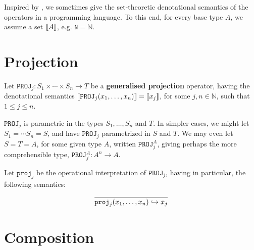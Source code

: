 Inspired by \cite{hofmann-2003}, we sometimes give the set-theoretic
denotational semantics of the operators in a programming language. To this end,
for every base type $A$, we assume a set ${\mathopen{}\left\llbracket{A}\right\rrbracket\mathclose{}}$, e.g. $\mathtt{N} =
\mathbb{N}$.

\section{Projection}

\label{sec:generalised-projection}

\begin{definition} Let $\mathtt{PROJ}_j : S_1 \times \cdots \times S_n
\rightarrow T$ be a \textbf{generalised projection} operator, having the
denotational semantics ${\mathopen{}\left\llbracket{\mathtt{PROJ}_j{\ensuremath{\mathopen{}\left({x_1,\ldots,x_n}\right)\mathclose{}}}}\right\rrbracket\mathclose{}} = {\mathopen{}\left\llbracket{x_j}\right\rrbracket\mathclose{}}$,
for some $j,n \in \mathbb{N}$, such that $1 \leq j \leq n$.  \end{definition}

\begin{remark} $\mathtt{PROJ}_j$ is parametric in the types $S_1,\ldots,S_n$
and $T$. In simpler cases, we might let $S_1 = \cdots S_n = S$, and have
$\mathtt{PROJ}_j$ parametrized in $S$ and $T$. We may even let $S = T = A$, for
some given type $A$, written $\mathtt{PROJ}_j^A$, giving perhaps the more
comprehensible type, $\mathtt{PROJ}_j^A : A^n \rightarrow A$. \end{remark}

\begin{definition} Let $\mathtt{proj}_j$ be the operational interpretation of
$\mathtt{PROJ}_j$, having in particular, the following semantics:\begin{align*}
%
\axiom{ \mathtt{proj}_j\p{x_1,\ldots,x_{n}} \goesto x_j }
%
\end{align*}

\end{definition}

\section{Composition}

\label{sec:generalised-composition}

